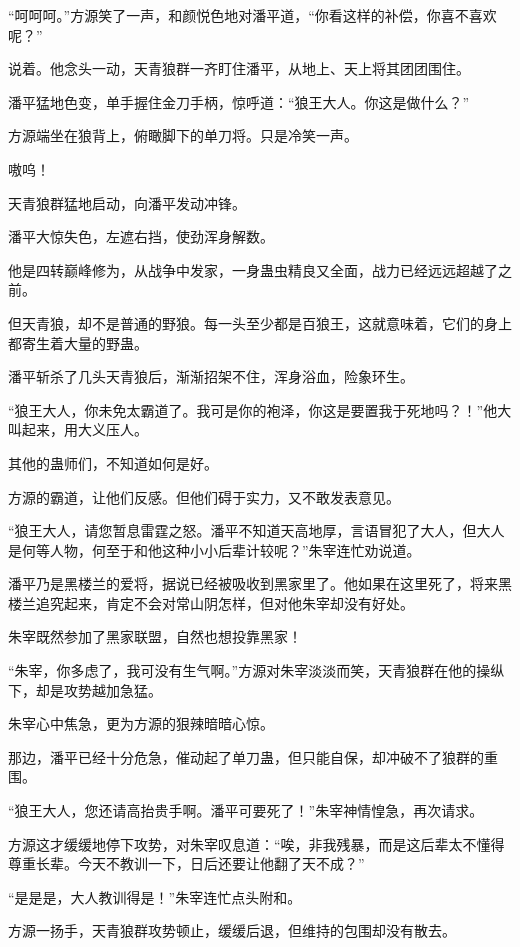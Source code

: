 \begin{this_body}
“呵呵呵。”方源笑了一声，和颜悦色地对潘平道，“你看这样的补偿，你喜不喜欢呢？”

说着。他念头一动，天青狼群一齐盯住潘平，从地上、天上将其团团围住。

潘平猛地色变，单手握住金刀手柄，惊呼道：“狼王大人。你这是做什么？”

方源端坐在狼背上，俯瞰脚下的单刀将。只是冷笑一声。

嗷呜！

天青狼群猛地启动，向潘平发动冲锋。

潘平大惊失色，左遮右挡，使劲浑身解数。

他是四转巅峰修为，从战争中发家，一身蛊虫精良又全面，战力已经远远超越了之前。

但天青狼，却不是普通的野狼。每一头至少都是百狼王，这就意味着，它们的身上都寄生着大量的野蛊。

潘平斩杀了几头天青狼后，渐渐招架不住，浑身浴血，险象环生。

“狼王大人，你未免太霸道了。我可是你的袍泽，你这是要置我于死地吗？！”他大叫起来，用大义压人。

其他的蛊师们，不知道如何是好。

方源的霸道，让他们反感。但他们碍于实力，又不敢发表意见。

“狼王大人，请您暂息雷霆之怒。潘平不知道天高地厚，言语冒犯了大人，但大人是何等人物，何至于和他这种小小后辈计较呢？”朱宰连忙劝说道。

潘平乃是黑楼兰的爱将，据说已经被吸收到黑家里了。他如果在这里死了，将来黑楼兰追究起来，肯定不会对常山阴怎样，但对他朱宰却没有好处。

朱宰既然参加了黑家联盟，自然也想投靠黑家！

“朱宰，你多虑了，我可没有生气啊。”方源对朱宰淡淡而笑，天青狼群在他的操纵下，却是攻势越加急猛。

朱宰心中焦急，更为方源的狠辣暗暗心惊。

那边，潘平已经十分危急，催动起了单刀蛊，但只能自保，却冲破不了狼群的重围。

“狼王大人，您还请高抬贵手啊。潘平可要死了！”朱宰神情惶急，再次请求。

方源这才缓缓地停下攻势，对朱宰叹息道：“唉，非我残暴，而是这后辈太不懂得尊重长辈。今天不教训一下，日后还要让他翻了天不成？”

“是是是，大人教训得是！”朱宰连忙点头附和。

方源一扬手，天青狼群攻势顿止，缓缓后退，但维持的包围却没有散去。


\end{this_body}
